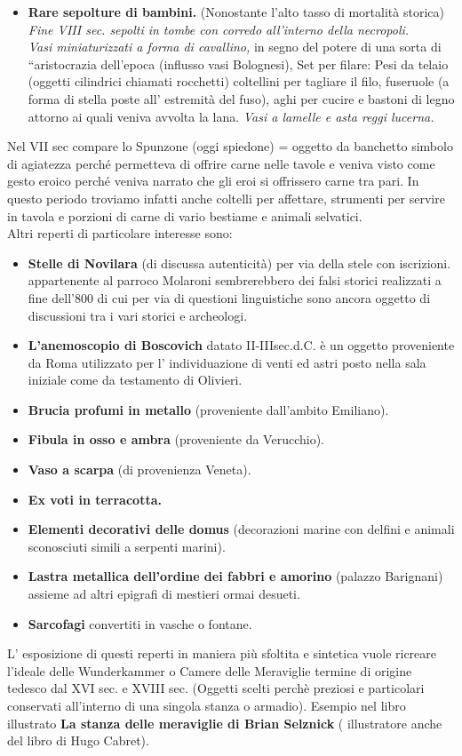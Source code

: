 \documentclass[hidelinks,12pt,a4paper]{article}
\begin{document}
\begin{flushleft}
\begin{itemize}
			\item \textbf{Rare sepolture di bambini.} (Nonostante l'alto tasso di mortalità storica)\\
			\textit{Fine VIII sec. sepolti in tombe con corredo all'interno della necropoli.}\\
			\textit{Vasi miniaturizzati a forma di cavallino,} in segno del potere di una sorta di “aristocrazia dell’epoca (influsso vasi Bolognesi), Set per filare: Pesi da telaio (oggetti cilindrici chiamati rocchetti) coltellini per tagliare il filo, fuseruole (a forma di stella poste all’ estremità del fuso), aghi per cucire e bastoni di legno attorno ai quali veniva avvolta la lana. \textit{Vasi a lamelle e asta reggi lucerna.}
		\end{itemize}
		Nel VII sec compare lo Spunzone (oggi spiedone) = oggetto da banchetto simbolo di agiatezza perché permetteva di offrire carne nelle tavole e veniva visto come gesto eroico perché veniva narrato che gli eroi si offrissero carne tra pari. In questo periodo troviamo infatti anche coltelli per affettare, strumenti per servire in tavola e porzioni di carne di vario bestiame e animali selvatici.\\
		Altri reperti di particolare interesse sono:
		\begin{itemize}
			\item \textbf{Stelle di Novilara} (di discussa autenticità) per via della stele con iscrizioni. appartenente al parroco Molaroni sembrerebbero dei falsi storici realizzati a fine dell’800 di cui per via di questioni linguistiche sono ancora oggetto di discussioni tra i vari storici e archeologi.
			\item \textbf{L'anemoscopio di Boscovich} datato II-IIIsec.d.C. è un oggetto proveniente da Roma utilizzato per l’ individuazione di venti ed astri posto nella sala iniziale come da testamento di Olivieri.
			\item \textbf{Brucia profumi in metallo} (proveniente dall'ambito Emiliano).
			\item \textbf{Fibula in osso e ambra} (proveniente da Verucchio).
			\item \textbf{Vaso a scarpa} (di provenienza Veneta).
			\item \textbf{Ex voti in terracotta.}
			\item \textbf{Elementi decorativi delle domus} (decorazioni marine con delfini e animali sconosciuti simili a serpenti marini).
			\item \textbf{Lastra metallica dell'ordine dei fabbri e amorino} (palazzo Barignani) assieme ad altri epigrafi di mestieri ormai desueti.
			\item \textbf{Sarcofagi} convertiti in vasche o fontane.
		\end{itemize}
		L’ esposizione di questi reperti in maniera più sfoltita e sintetica vuole ricreare l’ideale delle Wunderkammer o Camere delle Meraviglie termine di origine tedesco dal XVI sec. e XVIII sec. (Oggetti scelti perchè preziosi e particolari conservati all'interno di una singola stanza o armadio). Esempio nel libro illustrato \textbf{La stanza delle meraviglie di Brian Selznick} ( illustratore anche del libro di Hugo Cabret).
		

\end{flushleft}
\end{document}
